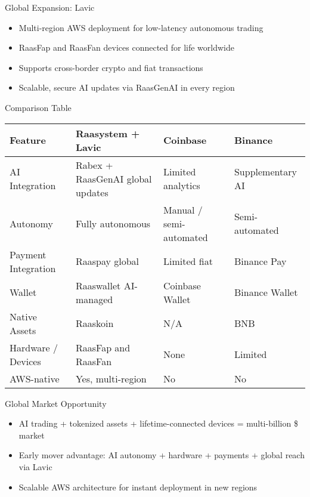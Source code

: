 \documentclass{beamer}
\begin{document}
\begin{frame}{Global Expansion: Lavic}
\begin{itemize}
    \item Multi-region AWS deployment for low-latency autonomous trading
    \item RaasFap and RaasFan devices connected for life worldwide
    \item Supports cross-border crypto and fiat transactions
    \item Scalable, secure AI updates via RaasGenAI in every region
\end{itemize}
\end{frame}

\begin{frame}{Comparison Table}
\begin{tabularx}{\textwidth}{lXXX}
\toprule
\textbf{Feature} & \textbf{Raasystem + Lavic} & \textbf{Coinbase} & \textbf{Binance} \\
\midrule
AI Integration & Rabex + RaasGenAI global updates & Limited analytics & Supplementary AI \\
Autonomy & Fully autonomous & Manual / semi-automated & Semi-automated \\
Payment Integration & Raaspay global & Limited fiat & Binance Pay \\
Wallet & Raaswallet AI-managed & Coinbase Wallet & Binance Wallet \\
Native Assets & Raaskoin & N/A & BNB \\
Hardware / Devices & RaasFap and RaasFan & None & Limited \\
AWS-native & Yes, multi-region & No & No \\
\bottomrule
\end{tabularx}
\end{frame}

\begin{frame}{Global Market Opportunity}
\begin{itemize}
    \item AI trading + tokenized assets + lifetime-connected devices = multi-billion \$ market
    \item Early mover advantage: AI autonomy + hardware + payments + global reach via Lavic
    \item Scalable AWS architecture for instant deployment in new regions
\end{itemize}
\end{frame}
\end{document}
